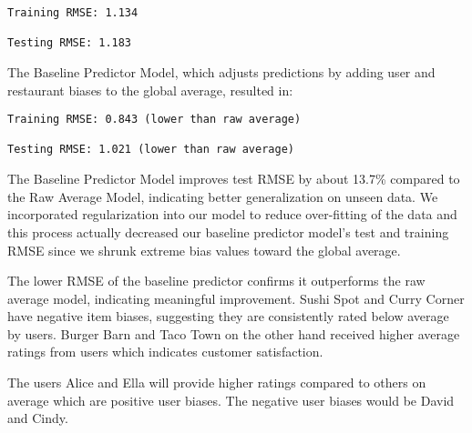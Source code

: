 \documentclass[
]{article}
\begin{document}
\begin{verbatim}
Training RMSE: 1.134

Testing RMSE: 1.183
\end{verbatim}

The Baseline Predictor Model, which adjusts predictions by adding user
and restaurant biases to the global average, resulted in:

\begin{verbatim}
Training RMSE: 0.843 (lower than raw average)

Testing RMSE: 1.021 (lower than raw average)
\end{verbatim}

The Baseline Predictor Model improves test RMSE by about 13.7\% compared
to the Raw Average Model, indicating better generalization on unseen
data. We incorporated regularization into our model to reduce
over-fitting of the data and this process actually decreased our
baseline predictor model's test and training RMSE since we shrunk
extreme bias values toward the global average.

The lower RMSE of the baseline predictor confirms it outperforms the raw
average model, indicating meaningful improvement. Sushi Spot and Curry
Corner have negative item biases, suggesting they are consistently rated
below average by users. Burger Barn and Taco Town on the other hand
received higher average ratings from users which indicates customer
satisfaction.

The users Alice and Ella will provide higher ratings compared to others
on average which are positive user biases. The negative user biases
would be David and Cindy.
\end{document}
